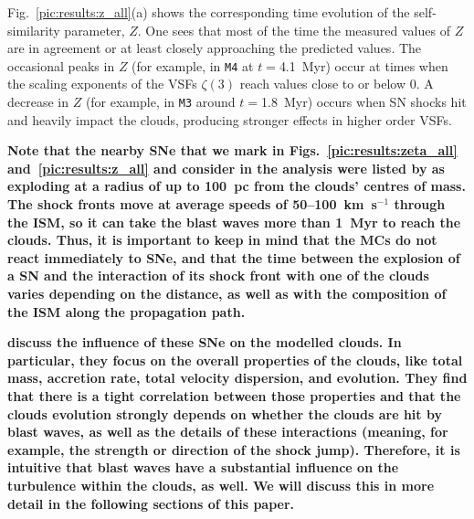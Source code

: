 Fig.~\ref{pic:results:z_all}(a) shows the corresponding time evolution of the self-similarity parameter, $Z$. 
One sees that most of the time the measured values of $Z$ are in agreement or at least closely approaching the predicted values. 
The occasional peaks in $Z$ (for example, in \texttt{M4} at $t=$4.1~Myr) occur at times when the scaling exponents of the VSFs $\zeta(3)$ reach values close to or below 0.
A decrease in $Z$ (for example, in \texttt{M3} around $t=$1.8~Myr) occurs when SN shocks hit and heavily impact the clouds, producing stronger effects in higher order VSFs.

\textbf{
	Note that the nearby SNe that we mark in Figs.~\ref{pic:results:zeta_all} and~\ref{pic:results:z_all} and consider in the analysis were listed by  as exploding at a radius of up to 100~pc from the clouds' centres of mass. The shock fronts move at average speeds of 50--100~km~s$^{-1}$ through the ISM, so it can take the blast waves more than 1~Myr to reach the clouds. Thus, it is important to keep in mind that the MCs do not react immediately to SNe, and that the time between the explosion of a SN and the interaction of its shock front with one of the clouds varies depending on the distance, as well as with the composition of the ISM along the propagation path.
}

\textbf{
	 discuss the influence of these SNe on the modelled clouds.
	In particular, they focus on the overall properties of the clouds, like total mass, accretion rate, total velocity dispersion, and evolution.
	They find that there is a tight correlation between those properties and that the clouds evolution strongly depends on whether the clouds are hit by blast waves, as well as the details of these interactions (meaning, for example, the strength or direction of the shock jump).
	Therefore, it is intuitive that blast waves have a substantial influence on the turbulence within the clouds, as well. 
	We will discuss this in more detail in the following sections of this paper.
}

